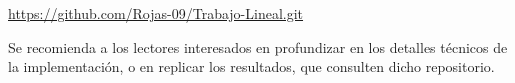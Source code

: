 \documentclass[12pt,a4paper]{article}
\begin{document}
\vspace{0.5cm}
\begin{center}
\url{https://github.com/Rojas-09/Trabajo-Lineal.git}
\end{center}
\vspace{0.5cm}

Se recomienda a los lectores interesados en profundizar en los detalles técnicos de la implementación, o en replicar los resultados, que consulten dicho repositorio.
\end{document}
